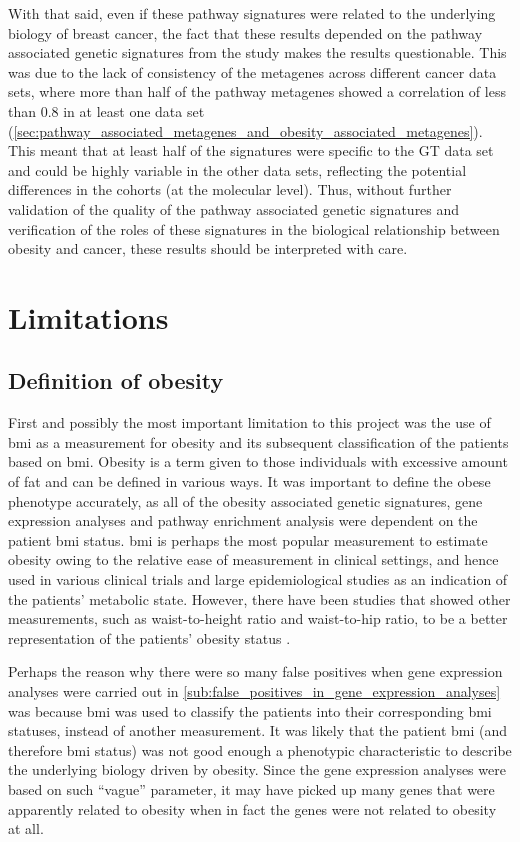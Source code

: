 With that said, even if these pathway signatures were related to the underlying biology of breast cancer, the fact that these results depended on the pathway associated genetic signatures from the \citet{Gatza2010a} study makes the results questionable.
This was due to the lack of consistency of the metagenes across different cancer data sets, where more than half of the pathway metagenes showed a correlation of less than 0.8 in at least one data set (\cref{sec:pathway_associated_metagenes_and_obesity_associated_metagenes}).
This meant that at least half of the signatures were specific to the GT data set and could be highly variable in the other data sets, reflecting the potential differences in the cohorts (at the molecular level).
Thus, without further validation of the quality of the pathway associated genetic signatures and verification of the roles of these signatures in the biological relationship between obesity and cancer, these results should be interpreted with care.

\section{Limitations}
\label{sec:limitations}

\subsection{Definition of obesity}
\label{sub:discussion_definition_of_obesity}

First and possibly the most important limitation to this project was the use of \gls{bmi} as a measurement for obesity and its subsequent classification of the patients based on \gls{bmi}.
Obesity is a term given to those individuals with excessive amount of fat and can be defined in various ways.
It was important to define the obese phenotype accurately, as all of the obesity associated genetic signatures, gene expression analyses and pathway enrichment analysis were dependent on the patient \gls{bmi} status.
\Gls{bmi} is perhaps the most popular measurement to estimate obesity owing to the relative ease of measurement in clinical settings, and hence used in various clinical trials and large epidemiological studies as an indication of the patients' metabolic state.
However, there have been studies that showed other measurements, such as waist-to-height ratio and waist-to-hip ratio, to be a better representation of the patients' obesity status \citep{Dalton2003,Lee2008}.

Perhaps the reason why there were so many false positives when gene expression analyses were carried out in \cref{sub:false_positives_in_gene_expression_analyses} was because \gls{bmi} was used to classify the patients into their corresponding \gls{bmi} statuses, instead of another measurement.
It was likely that the patient \gls{bmi} (and therefore \gls{bmi} status) was not good enough a phenotypic characteristic to describe the underlying biology driven by obesity.
Since the gene expression analyses were based on such ``vague'' parameter, it may have picked up many genes that were apparently related to obesity when in fact the genes were not related to obesity at all.

